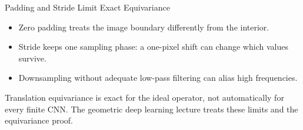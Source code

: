 \documentclass{ntuabeamer}
\begin{document}
\begin{frame}{Padding and Stride Limit Exact Equivariance}
  \begin{itemize}
    \item Zero padding treats the image boundary differently from the interior.
    \item Stride keeps one sampling phase: a one-pixel shift can change which values survive.
    \item Downsampling without adequate low-pass filtering can alias high frequencies.
  \end{itemize}
  Translation equivariance is exact for the ideal operator, not automatically for every finite CNN.
  The geometric deep learning lecture treats these limits and the equivariance proof.
\end{frame}
\end{document}
